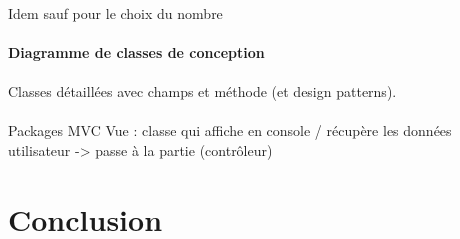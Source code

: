 \documentclass{article}
\begin{document}
    \paragraph{}
    Idem sauf pour le choix du nombre


    \newpage
    \paragraph{Diagramme de classes de conception}

    \paragraph{}
    Classes détaillées avec champs et méthode (et design patterns).

    \paragraph{}
    Packages MVC
    Vue : classe qui affiche en console / récupère les données utilisateur -> passe à la partie (contrôleur)



    
    
    




    \section*{Conclusion}
    \label{sec:concl}
\end{document}
